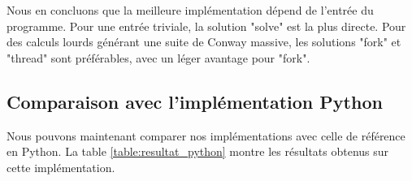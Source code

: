 \documentclass[a4paper,11pt]{article}
\begin{document}
Nous en concluons que la meilleure implémentation dépend de l'entrée du programme. Pour une entrée triviale, la solution "solve" est la plus directe. Pour des calculs lourds générant une suite de Conway massive, les solutions "fork" et "thread" sont préférables, avec un léger avantage pour "fork".

\subsection{Comparaison avec l'implémentation Python}

Nous pouvons maintenant comparer nos implémentations avec celle de référence en Python. La table \ref{table:resultat_python} montre les résultats obtenus sur cette implémentation.

\begin{table}[h]
\centering
{}
\end{table}
\end{document}
